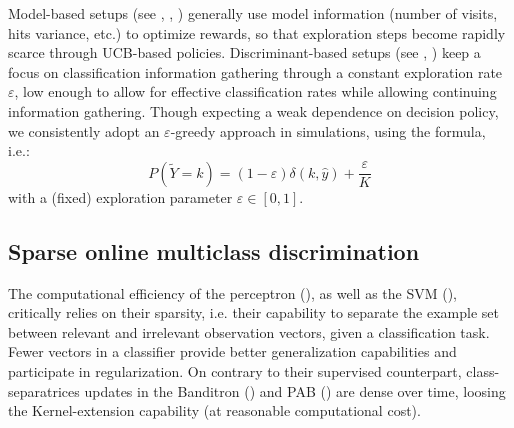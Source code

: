 \documentclass[preprint,12pt,authoryear]{elsarticle}
\begin{document}
Model-based setups (see \cite{lai1985asymptotically}, \cite{auer2003nonstochastic}, \cite{crammer2013multiclass}) generally use model information (number of visits, hits variance, etc.) to optimize rewards, so that exploration steps become rapidly scarce through UCB-based policies. 
Discriminant-based setups (see \cite{kakade2008efficient}, \cite{zhong2015esann}) keep a focus on classification information gathering through  
a constant exploration rate $\varepsilon$, low enough to allow for effective classification rates while allowing continuing information gathering.
Though expecting a weak dependence on decision policy, we consistently adopt an $\varepsilon$-greedy approach in simulations, using the \cite{kakade2008efficient} formula, i.e.:
$$P(\tilde{Y}=k) = (1-\varepsilon) \delta(k,\hat{y}) + \frac{\varepsilon}{K}$$ with a (fixed) exploration parameter $\varepsilon \in [0,1]$.


\subsection{Sparse online multiclass discrimination}\label{sec:sparse-online-multiclass-discrimination}

%



The computational efficiency of the perceptron (\cite{rosenblatt1958perceptron}), as well as the SVM (\cite{vapnik1998statistical}),  critically relies on their sparsity, i.e. their capability to separate the example  set between relevant and irrelevant observation vectors, given a classification task. Fewer vectors in a classifier provide better generalization capabilities and participate in regularization.
On contrary to their supervised counterpart, class-separatrices updates in the Banditron (\cite{kakade2008efficient}) and PAB (\cite{zhong2015esann}) are dense over time, loosing the Kernel-extension capability (at reasonable computational cost). 
\end{document}
